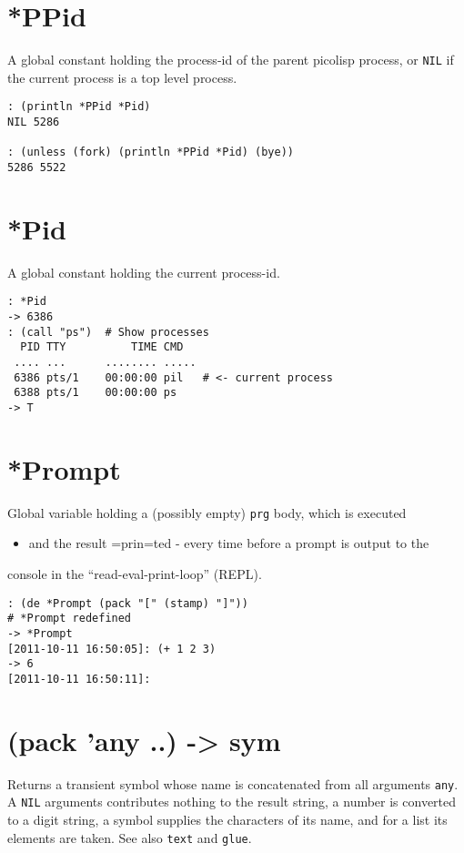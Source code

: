 {{{{{{{ 
\section{*PPid}
\label{sec-8-1-16-1}


A global constant holding the process-id of the parent picolisp process,
or \texttt{NIL} if the current process is a top level process.


\begin{verbatim}
: (println *PPid *Pid)
NIL 5286

: (unless (fork) (println *PPid *Pid) (bye))
5286 5522
\end{verbatim}

 
\section{*Pid}
\label{sec-8-1-16-2}


A global constant holding the current process-id.


\begin{verbatim}
: *Pid
-> 6386
: (call "ps")  # Show processes
  PID TTY          TIME CMD
 .... ...      ........ .....
 6386 pts/1    00:00:00 pil   # <- current process
 6388 pts/1    00:00:00 ps
-> T
\end{verbatim}

 
\section{*Prompt}
\label{sec-8-1-16-3}


Global variable holding a (possibly empty) \texttt{prg} body, which is executed
\begin{itemize}
\item and the result =prin=ted - every time before a prompt is output to the
\end{itemize}
console in the ``read-eval-print-loop'' (REPL).


\begin{verbatim}
: (de *Prompt (pack "[" (stamp) "]"))
# *Prompt redefined
-> *Prompt
[2011-10-11 16:50:05]: (+ 1 2 3)
-> 6
[2011-10-11 16:50:11]:
\end{verbatim}

 
\section{(pack 'any ..) -> sym}
\label{sec-8-1-16-4}


Returns a transient symbol whose name is concatenated from all arguments
\texttt{any}. A \texttt{NIL} arguments contributes nothing to the result string, a
number is converted to a digit string, a symbol supplies the characters
of its name, and for a list its elements are taken. See also \texttt{text} and
\texttt{glue}.


}}}}}}}
